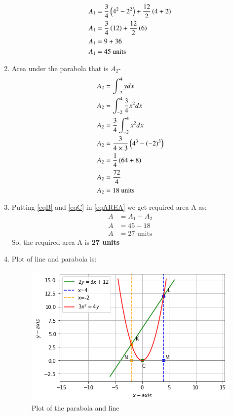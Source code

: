 \documentclass[journal,12pt,twocolumn]{IEEEtran}
\begin{document}
\begin{enumerate}
\begin{align}
    \end{align}
    \begin{align}
    A_1&= \frac{3}{4}\left(4^2-2^2\right) +\frac{12}{2}\left(4+2\right)
   \\
    A_1&= \frac{3}{4}\left(12\right) +\frac{12}{2}\left(6\right)
    \\
    A_1&= 9 +36
    \\
    A_1 &=45 \text{ units} \label{eqB}
\end{align}
\item Area under the parabola that is $A_2$-
\begin{align}
    A_2&= \int_{-2}^{4} y dx
    \\
    A_2&= \int_{-2}^{4} \frac{3}{4} x^2 dx
    \\
    A_2&= \frac{3}{4} \int_{-2}^{4}  x^2 dx
    \\
    A_2&= \frac{3}{4\times3} \left(4^3-\left(-2\right)^3\right)
    \\
    A_2&= \frac{1}{4} \left(64 +8\right)
    \\
    A_2&= \frac{72}{4} 
    \\
    A_2&= 18 \text{ units} \label{eqC}
\end{align}
\item Putting \eqref{eqB} and \eqref{eqC} in \eqref{eqAREA} we get required area A as:
\begin{align}
 A &= A_1 -A_2 
 \\
 A &= 45-18
 \\
 A &= 27 \text{ units}
\end{align}
So, the required area A is \textbf{27 units}
\item Plot of line and parabola is:
\begin{figure}[ht]
\centering
\includegraphics[width=\columnwidth]{LINE AND PARABOLA.png}
\caption{Plot of the parabola and line}
\label{Plot of the Parabola and line}
\end{figure}
\end{enumerate}
\end{document}
